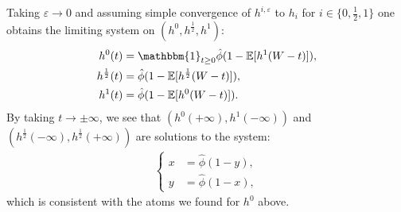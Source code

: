 \documentclass[11pt]{article}
\newcommand{\eps}{\varepsilon}
\begin{document}
Taking $\eps \rightarrow 0$ and assuming simple convergence of $h^{i,\eps}$ to $h_i$ for $i \in \{0, \frac{1}{2},1\}$ one obtains the limiting system on $(h^0, h^{\frac{1}{2}}, h^1)$:
\begin{equation}
\begin{aligned}\label{eq:systemzoomER}
    h^{0}(t)&= \mathbbm{1}_{t \geq 0} \hat{\phi}(1-\mathbb{E}[h^{1}(W-t)]), \\
    h^{\frac{1}{2}}(t) &= \hat{\phi}(1-\mathbb{E}[h^{\frac{1}{2}}(W-t)]) ,\\
    h^{1}(t)&= \hat{\phi}(1-\mathbb{E}[h^{0}(W-t)]).
\end{aligned}
\end{equation}
By taking $t\rightarrow \pm \infty $, we see that $(h^{0}(+\infty),h^1(-\infty))$ and $(h^{\frac{1}{2}}(-\infty), h^{\frac{1}{2}}(+\infty))$ are solutions to the system:
\begin{align*}
\begin{cases}
    x&=\hat{\phi}(1-y), \\
    y&=\hat{\phi}(1-x),
\end{cases}
\end{align*}
which is consistent with the atoms we found for $h^0$ above.
\end{document}
